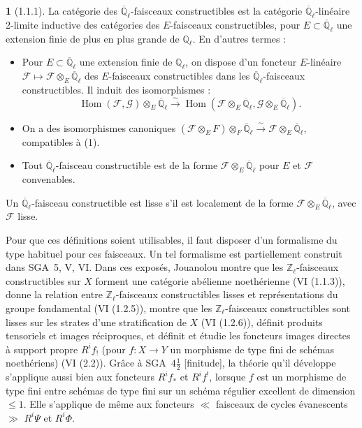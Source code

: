 \documentclass[12pt,a4paper]{article}
\theoremstyle{plain}
\theoremstyle{definition}
\theoremstyle{definition}
\newtheorem{para}{}[section]
\theoremstyle{remark}
\DeclareMathOperator{\Hom}{Hom}
\begin{document}
\begin{para}[1.1.1]
La cat\'egorie des $\overline{\mathbb{Q}}_\ell$-faisceaux constructibles est la cat\'egorie $\overline{\mathbb{Q}}_\ell$-lin\'eaire 2-limite inductive des cat\'egories des $E$-faisceaux constructibles, pour $E \subset \overline{\mathbb{Q}}_\ell$ une extension finie de plus en plus grande de $\mathbb{Q}_\ell$. En d'autres termes :
\begin{itemize}[nosep]
\item[$\alpha$)] Pour $E \subset \overline{\mathbb{Q}}_\ell$ une extension finie de $\mathbb{Q}_\ell$, on dispose d'un foncteur $E$-lin\'eaire $\mathscr{F} \mapsto \mathscr{F} \otimes_E \overline{\mathbb{Q}}_\ell$ des $E$-faisceaux constructibles dans les $\overline{\mathbb{Q}}_\ell$-faisceaux constructibles. Il induit des isomorphismes :
\[\Hom(\mathscr{F}, \mathscr{G}) \otimes_E \overline{\mathbb{Q}}_\ell \xrightarrow{\sim} \Hom(\mathscr{F} \otimes_E \overline{\mathbb{Q}}_\ell, \mathscr{G} \otimes_E \overline{\mathbb{Q}}_\ell).\]
\item[$\beta$)] On a des isomorphismes canoniques $(\mathscr{F} \otimes_E F) \otimes_F \overline{\mathbb{Q}}_\ell \xrightarrow{\sim} \mathscr{F} \otimes_E \overline{\mathbb{Q}}_\ell$, compatibles \`a (1).
\item[$\gamma$)] Tout $\overline{\mathbb{Q}}_\ell$-faisceau constructible est de la forme $\mathscr{F} \otimes_E \overline{\mathbb{Q}}_\ell$ pour $E$ et $\mathscr{F}$ convenables.
\end{itemize}

Un $\overline{\mathbb{Q}}_\ell$-faisceau constructible est lisse s'il est localement de la forme $\mathscr{F} \otimes_E \overline{\mathbb{Q}}_\ell$, avec $\mathscr{F}$ lisse.

Pour que ces d\'efinitions soient utilisables, il faut disposer d'un formalisme du type habituel pour ces faisceaux. Un tel formalisme est partiellement construit dans SGA~5, V, VI. Dans ces expos\'es, Jouanolou montre que les $\mathbb{Z}_\ell$-faisceaux constructibles sur $X$ forment une cat\'egorie ab\'elienne noeth\'erienne (VI (1.1.3)), donne la relation entre $\mathbb{Z}_\ell$-faisceaux constructibles lisses et repr\'esentations du groupe fondamental (VI (1.2.5)), montre que les $\mathbb{Z}_\ell$-faisceaux constructibles sont lisses sur les strates d'une stratification de $X$ (VI (1.2.6)), d\'efinit produits tensoriels et images r\'eciproques, et d\'efinit et \'etudie les foncteurs images directes \`a support propre $R^i f_!$ (pour $f: X \to Y$ un morphisme de type fini de sch\'emas noeth\'eriens) (VI (2.2)). Gr\^ace \`a SGA~$4\frac{1}{2}$ [finitude], la th\'eorie qu'il d\'eveloppe s'applique aussi bien aux foncteurs $R^i f_*$ et $R^i f^!$, lorsque $f$ est un morphisme de type fini entre sch\'emas de type fini sur un sch\'ema r\'egulier excellent de dimension $\leq 1$. Elle s'applique de m\^eme aux foncteurs $\ll$ faisceaux de cycles \'evanescents $\gg$ $R^i \Psi$ et $R^i \Phi$.
\end{para}
\end{document}
